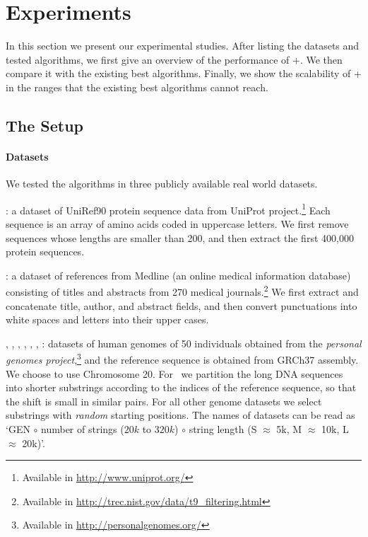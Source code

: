 \section{Experiments}
\label{sec:exp}

In this section we present our experimental studies.  After listing the datasets and tested algorithms, we first give an overview of the performance of \ebdjoin+. We then compare it with the existing best algorithms.  Finally, we show the scalability of \ebdjoin+ in the ranges that the existing best algorithms cannot reach.

\subsection{The Setup}
\label{sec:setup}


\paragraph{Datasets} 
We tested the algorithms in three publicly available real world datasets.

\medskip
\noindent \uniref: a dataset of UniRef90 protein sequence data from UniProt project.\footnote{Available in \url{http://www.uniprot.org/}
} Each sequence is an array of amino acids coded in uppercase letters. We first remove sequences whose lengths are smaller than 200, and then extract the first 400,000 protein sequences. 

\medskip
\noindent \trec:  a dataset of references from Medline (an online medical information database) consisting of titles and abstracts from 270 medical journals.\footnote{Available in \url{http://trec.nist.gov/data/t9_filtering.html}
} We first extract and concatenate title, author, and abstract fields, and then convert punctuations into white spaces and letters into their upper cases. 

\medskip
\noindent \genoaa, \genoa, \genob, \genoc, \genod, \genoe, \genof:  datasets of human genomes of 50 individuals obtained from the {\em personal genomes project},\footnote{Available in \url{http://personalgenomes.org/}} and the reference sequence is obtained from GRCh37 assembly.   We choose to use Chromosome 20.  For \genoaa\ we partition the long DNA sequences into shorter substrings according to the indices of the reference sequence, so that the shift is small in similar pairs. For all other genome datasets we select substrings with {\em random} starting positions.  The names of datasets can be read as `GEN $\circ$ number of strings ($20k$ to $320k$) $\circ$ string length (S $\approx$ 5k, M $\approx$ 10k, L $\approx$ 20k)'. 

